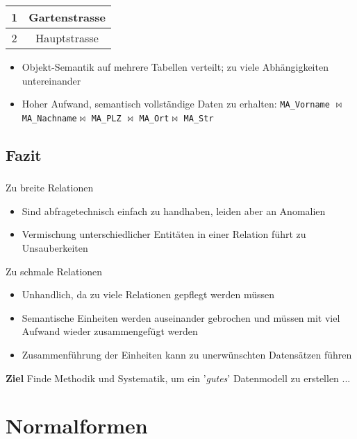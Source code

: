 \begin{frame}[t]
\begin{center}
\begin{tabular}{|c|c|}
		\small 1 &\small Gartenstrasse \\\hline 
		\small 2 &\small Hauptstrasse \\\hline 
	\end{tabular}
\end{center}
\begin{itemize}
	\item Objekt-Semantik auf mehrere Tabellen verteilt; zu viele Abh\"angigkeiten untereinander 
	\item Hoher Aufwand, semantisch vollständige Daten zu erhalten: 
	\nl
	\texttt{MA\_Vorname} $\Join$ \texttt{MA\_Nachname}$\Join$ \texttt{MA\_PLZ} $\Join$ \texttt{MA\_Ort}$\Join$ \texttt{MA\_Str} 
\end{itemize}
\end{frame}

\subsection{Fazit}
\begin{frame}[t]\frametitle{\insertsection}
\framesubtitle{\insertsubsection}
\begin{block}{Zu breite Relationen}
	\begin{itemize}
		\item Sind abfragetechnisch einfach zu handhaben, leiden aber an Anomalien
		\item Vermischung unterschiedlicher Entit\"aten in einer Relation f\"uhrt zu Unsauberkeiten
	\end{itemize}
\end{block}
\pause
\begin{block}{Zu schmale Relationen}
	\begin{itemize}
		\item Unhandlich, da zu viele Relationen gepflegt werden m\"ussen
		\item Semantische Einheiten werden auseinander gebrochen und m\"ussen mit viel Aufwand wieder zusammengef\"ugt werden
		\item Zusammenf\"uhrung der Einheiten kann zu unerw\"unschten Datens\"atzen f\"uhren
	\end{itemize}
\end{block}
\pause
\begin{block}{\textbf{Ziel}}
	Finde Methodik und Systematik, um ein '\textit{gutes}' Datenmodell zu erstellen ...
\end{block}
\end{frame}

\section{Normalformen}

